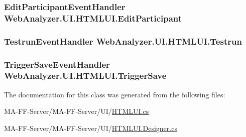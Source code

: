 \subsubsection[{Edit\+Participant}]{\setlength{\rightskip}{0pt plus 5cm}Edit\+Participant\+Event\+Handler Web\+Analyzer.\+U\+I.\+H\+T\+M\+L\+U\+I.\+Edit\+Participant}\label{class_web_analyzer_1_1_u_i_1_1_h_t_m_l_u_i_a41d7bba18de0e030779e1bc57de9d267}
\hypertarget{class_web_analyzer_1_1_u_i_1_1_h_t_m_l_u_i_adb77cf3b6fe81466fc13561570764024}{}
\subsubsection[{Testrun}]{\setlength{\rightskip}{0pt plus 5cm}Testrun\+Event\+Handler Web\+Analyzer.\+U\+I.\+H\+T\+M\+L\+U\+I.\+Testrun}\label{class_web_analyzer_1_1_u_i_1_1_h_t_m_l_u_i_adb77cf3b6fe81466fc13561570764024}
\hypertarget{class_web_analyzer_1_1_u_i_1_1_h_t_m_l_u_i_a88837323ee334b87422f0d8cf1897952}{}
\subsubsection[{Trigger\+Save}]{\setlength{\rightskip}{0pt plus 5cm}Trigger\+Save\+Event\+Handler Web\+Analyzer.\+U\+I.\+H\+T\+M\+L\+U\+I.\+Trigger\+Save}\label{class_web_analyzer_1_1_u_i_1_1_h_t_m_l_u_i_a88837323ee334b87422f0d8cf1897952}


The documentation for this class was generated from the following files\+:\begin{DoxyCompactItemize}
\item 
M\+A-\/\+F\+F-\/\+Server/\+M\+A-\/\+F\+F-\/\+Server/\+U\+I/\hyperlink{_h_t_m_l_u_i_8cs}{H\+T\+M\+L\+U\+I.\+cs}\item 
M\+A-\/\+F\+F-\/\+Server/\+M\+A-\/\+F\+F-\/\+Server/\+U\+I/\hyperlink{_h_t_m_l_u_i_8_designer_8cs}{H\+T\+M\+L\+U\+I.\+Designer.\+cs}\end{DoxyCompactItemize}
